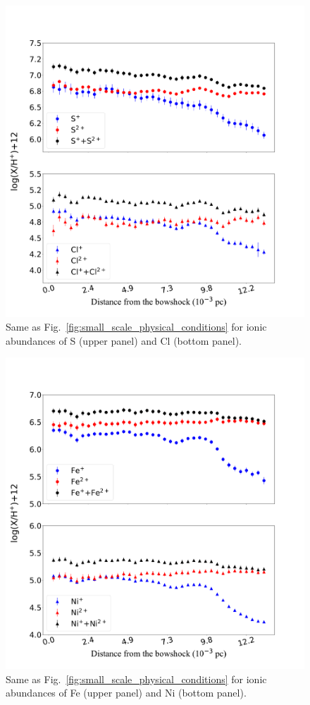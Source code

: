 \documentclass[twocolumn]{aastex63}
\begin{document}
\begin{figure}
\centering
\includegraphics[width=\columnwidth]{cl_s_abundances.pdf}
\caption{Same as Fig.~\ref{fig:small_scale_physical_conditions} for ionic abundances of S (upper panel) and Cl (bottom panel). }
\label{fig:cl_s_abundances}
\end{figure}

\begin{figure}
\centering
\includegraphics[width=\columnwidth]{ni_fe_abundances.pdf}
\caption{Same as Fig.~\ref{fig:small_scale_physical_conditions} for ionic abundances of Fe (upper panel) and Ni (bottom panel). }
\label{fig:fe_ni_abundances}
\end{figure}
\end{document}
